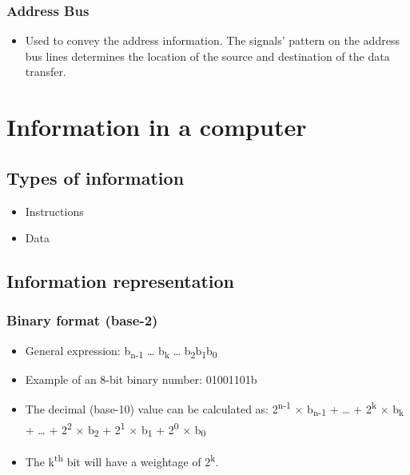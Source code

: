 \documentclass[11pt]{article}
\begin{document}
\subsubsection{Address Bus}
\label{sec:org79fe214}
\begin{itemize}
\item Used to convey the address information. The signals' pattern on the address bus lines determines the location of the source and destination of the data transfer.
\end{itemize}


\section{Information in a computer}
\label{sec:orgee2e615}

\subsection{Types of information}
\label{sec:orgaacebaa}
\begin{itemize}
\item Instructions
\item Data
\end{itemize}

 \newpage

\subsection{Information representation}
\label{sec:org9119e44}

\subsubsection{Binary format (base-2)}
\label{sec:org9116a3f}
\begin{itemize}
\item General expression: b\textsubscript{n-1} \ldots{} b\textsubscript{k} \ldots{} b\textsubscript{2}b\textsubscript{1}b\textsubscript{0}
\item Example of an 8-bit binary number: 01001101b
\item The decimal (base-10) value can be calculated as:
2\textsuperscript{n-1} × b\textsubscript{n-1} + \ldots{} + 2\textsuperscript{k} × b\textsubscript{k} + \ldots{} + 2\textsuperscript{2} × b\textsubscript{2} + 2\textsuperscript{1} × b\textsubscript{1} + 2\textsuperscript{0} × b\textsubscript{0}

\item The k\textsuperscript{th} bit will have a weightage of 2\textsuperscript{k}.
\end{itemize}
\end{document}
